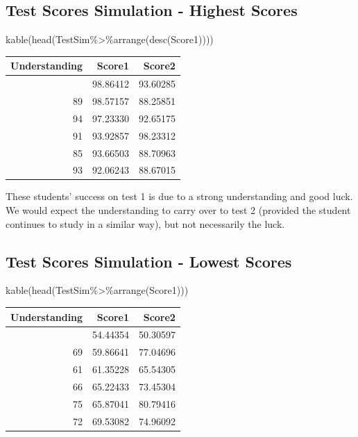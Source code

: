 \documentclass[
  letterpaper,
  DIV=11,
  numbers=noendperiod]{scrreprt}
\newenvironment{Shaded}{\begin{snugshade}}{\end{snugshade}}
\newcommand{\FunctionTok}[1]{\textcolor[rgb]{0.28,0.35,0.67}{#1}}
\newcommand{\NormalTok}[1]{\textcolor[rgb]{0.00,0.23,0.31}{#1}}
\newcommand{\SpecialCharTok}[1]{\textcolor[rgb]{0.37,0.37,0.37}{#1}}
\begin{document}
\subsection{Test Scores Simulation - Highest
Scores}\label{test-scores-simulation---highest-scores}

\begin{Shaded}
\begin{Highlighting}[]
\FunctionTok{kable}\NormalTok{(}\FunctionTok{head}\NormalTok{(TestSim}\SpecialCharTok{\%\textgreater{}\%}\FunctionTok{arrange}\NormalTok{(}\FunctionTok{desc}\NormalTok{(Score1))))}
\end{Highlighting}
\end{Shaded}

\begin{longtable}[]{@{}rrr@{}}
\toprule\noalign{}
Understanding & Score1 & Score2 \\
\midrule\noalign{}
\endhead
\bottomrule\noalign{}
\endlastfoot
97 & 98.86412 & 93.60285 \\
89 & 98.57157 & 88.25851 \\
94 & 97.23330 & 92.65175 \\
91 & 93.92857 & 98.23312 \\
85 & 93.66503 & 88.70963 \\
93 & 92.06243 & 88.67015 \\
\end{longtable}

These students' success on test 1 is due to a strong understanding and
good luck. We would expect the understanding to carry over to test 2
(provided the student continues to study in a similar way), but not
necessarily the luck.

\subsection{Test Scores Simulation - Lowest
Scores}\label{test-scores-simulation---lowest-scores}

\begin{Shaded}
\begin{Highlighting}[]
\FunctionTok{kable}\NormalTok{(}\FunctionTok{head}\NormalTok{(TestSim}\SpecialCharTok{\%\textgreater{}\%}\FunctionTok{arrange}\NormalTok{(Score1)))}
\end{Highlighting}
\end{Shaded}

\begin{longtable}[]{@{}rrr@{}}
\toprule\noalign{}
Understanding & Score1 & Score2 \\
\midrule\noalign{}
\endhead
\bottomrule\noalign{}
\endlastfoot
58 & 54.44354 & 50.30597 \\
69 & 59.86641 & 77.04696 \\
61 & 61.35228 & 65.54305 \\
66 & 65.22433 & 73.45304 \\
75 & 65.87041 & 80.79416 \\
72 & 69.53082 & 74.96092 \\
\end{longtable}
\end{document}
